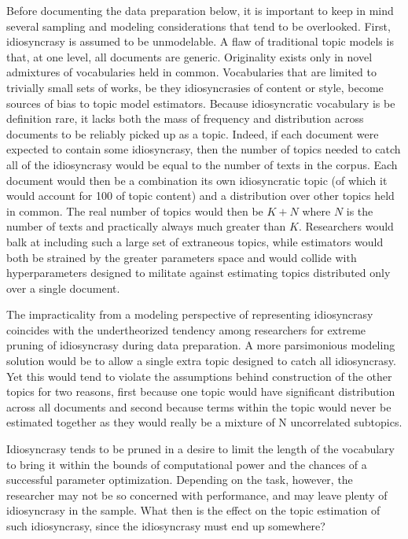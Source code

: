 \documentclass[]{book}
\theoremstyle{definition}
\theoremstyle{definition}
\theoremstyle{definition}
\theoremstyle{remark}
\begin{document}
Before documenting the data preparation below, it is important to keep
in mind several sampling and modeling considerations that tend to be
overlooked. First, idiosyncrasy is assumed to be unmodelable. A flaw of
traditional topic models is that, at one level, all documents are
generic. Originality exists only in novel admixtures of vocabularies
held in common. Vocabularies that are limited to trivially small sets of
works, be they idiosyncrasies of content or style, become sources of
bias to topic model estimators. Because idiosyncratic vocabulary is be
definition rare, it lacks both the mass of frequency and distribution
across documents to be reliably picked up as a topic. Indeed, if each
document were expected to contain some idiosyncrasy, then the number of
topics needed to catch all of the idiosyncrasy would be equal to the
number of texts in the corpus. Each document would then be a combination
its own idiosyncratic topic (of which it would account for 100 of topic
content) and a distribution over other topics held in common. The real
number of topics would then be \(K+N\) where \(N\) is the number of
texts and practically always much greater than \(K\). Researchers would
balk at including such a large set of extraneous topics, while
estimators would both be strained by the greater parameters space and
would collide with hyperparameters designed to militate against
estimating topics distributed only over a single document.

The impracticality from a modeling perspective of representing
idiosyncrasy coincides with the undertheorized tendency among
researchers for extreme pruning of idiosyncrasy during data preparation.
A more parsimonious modeling solution would be to allow a single extra
topic designed to catch all idiosyncrasy. Yet this would tend to violate
the assumptions behind construction of the other topics for two reasons,
first because one topic would have significant distribution across all
documents and second because terms within the topic would never be
estimated together as they would really be a mixture of N uncorrelated
subtopics.

Idiosyncrasy tends to be pruned in a desire to limit the length of the
vocabulary to bring it within the bounds of computational power and the
chances of a successful parameter optimization. Depending on the task,
however, the researcher may not be so concerned with performance, and
may leave plenty of idiosyncrasy in the sample. What then is the effect
on the topic estimation of such idiosyncrasy, since the idiosyncrasy
must end up somewhere?
\end{document}
